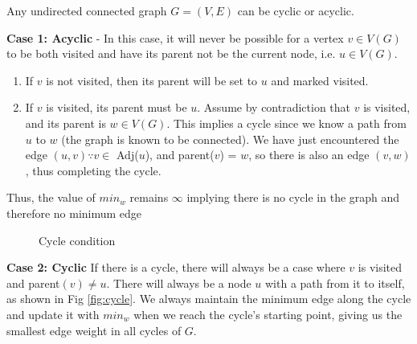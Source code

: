\documentclass[12pt]{article}
\begin{document}
Any undirected connected graph $G = (V, E)$ can be cyclic or acyclic.

\textbf{Case 1: Acyclic} - In this case, it will never be possible for a vertex $v \in V(G)$ to be both visited and have its parent not be the current node, i.e. $u \in V(G)$.

\begin{enumerate}
    \item If $v$ is not visited, then its parent will be set to $u$ and marked visited.
    \item If $v$ is visited, its parent must be $u$. Assume by contradiction that $v$ is visited, and its parent is $w \in V(G)$. This implies a cycle since we know a path from $u$ to $w$ (the graph is known to be connected). We have just encountered the edge $(u, v) \because v \in$ Adj($u$), and parent($v$) = $w$, so there is also an edge $(v, w)$, thus completing the cycle.
\end{enumerate}

Thus, the value of $min_w$ remains $\infty$ implying there is no cycle in the graph and therefore no minimum edge

\begin{figure}[ht]
\centering
{}
\caption{Cycle condition}
\label{fig:contradiction}

\end{figure}



\textbf{Case 2: Cyclic} If there is a cycle, there will always be a case where $v$ is visited and parent$(v) \neq u$. There will always be a node $u$ with a path from it to itself, as shown in Fig \ref{fig:cycle}. We always maintain the minimum edge along the cycle and update it with $min_w$ when we reach the cycle's starting point, giving us the smallest edge weight in all cycles of $G$.
\end{document}
